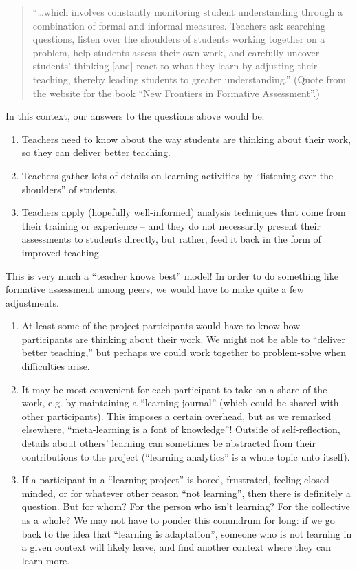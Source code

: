 \begin{quote}
``\ldots{}which involves constantly monitoring student understanding
through a combination of formal and informal measures. Teachers ask
searching questions, listen over the shoulders of students working
together on a problem, help students assess their own work, and
carefully uncover students' thinking {[}and{]} react to what they learn
by adjusting their teaching, thereby leading students to greater
understanding.'' (Quote from the website for the book ``New Frontiers in
Formative Assessment''.)
\end{quote}

In this context, our answers to the questions above would be:

\begin{enumerate}
\item
  Teachers need to know about the way students are thinking about their
  work, so they can deliver better teaching.
\item
  Teachers gather lots of details on learning activities by ``listening
  over the shoulders'' of students.
\item
  Teachers apply (hopefully well-informed) analysis techniques that come
  from their training or experience -- and they do not necessarily
  present their assessments to students directly, but rather, feed it
  back in the form of improved teaching.
\end{enumerate}

This is very much a ``teacher knows best'' model! In order to do
something like formative assessment among peers, we would have to make
quite a few adjustments.

\begin{enumerate}
\item
  At least some of the project participants would have to know how
  participants are thinking about their work. We might not be able to
  ``deliver better teaching,'' but perhaps we could work together to
  problem-solve when difficulties arise.
\item
  It may be most convenient for each participant to take on a share of
  the work, e.g. by maintaining a ``learning journal'' (which could be
  shared with other participants). This imposes a certain overhead, but
  as we remarked elsewhere, ``meta-learning is a font of knowledge''!
  Outside of self-reflection, details about others' learning can
  sometimes be abstracted from their contributions to the project
  (``learning analytics'' is a whole topic unto itself).
\item
  If a participant in a ``learning project'' is bored, frustrated,
  feeling closed-minded, or for whatever other reason ``not learning'',
  then there is definitely a question. But for whom? For the person who
  isn't learning? For the collective as a whole? We may not have to
  ponder this conundrum for long: if we go back to the idea that
  ``learning is adaptation'', someone who is not learning in a given
  context will likely leave, and find another context where they can
  learn more.
\end{enumerate}

